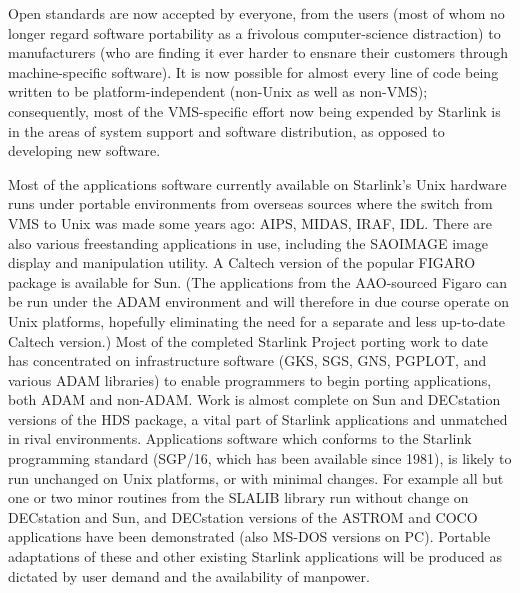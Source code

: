 Open standards are now accepted by everyone, from the users (most
of whom no longer regard software portability as a frivolous
computer-science distraction) to manufacturers (who are finding it
ever harder to ensnare their customers through machine-specific
software).  It is now possible for almost every line of code being
written to be platform-independent (non-Unix as well as non-VMS);
consequently, most of the VMS-specific effort now being expended by
Starlink is in the areas of system support and software distribution, as
opposed to developing new software.

Most of the applications software currently available on Starlink's Unix
hardware runs under portable environments from overseas sources where
the switch from VMS to Unix was made some years ago:  AIPS, MIDAS, IRAF,
IDL.  There are also various freestanding applications in use, including
the SAOIMAGE image display and manipulation utility.  A Caltech version
of the popular FIGARO package is available for Sun.  (The applications
from the AAO-sourced Figaro can be run under the ADAM environment and
will therefore in due course operate on Unix platforms, hopefully
eliminating the need for a separate and less up-to-date Caltech version.)
Most of the completed Starlink Project porting work to date has
concentrated on infrastructure software (GKS, SGS, GNS, PGPLOT, and
various ADAM libraries) to enable programmers to begin porting
applications, both ADAM and non-ADAM.  Work is almost complete on Sun
and DECstation versions of the HDS package, a vital part of Starlink
applications and unmatched in rival environments.  Applications software
which conforms to the Starlink programming standard (SGP/16, which has
been available since 1981), is likely to run unchanged on Unix
platforms, or with minimal changes.  For example all but one or two
minor routines from the SLALIB library run without change on DECstation
and Sun, and DECstation versions of the ASTROM and COCO applications
have been demonstrated (also MS-DOS versions on PC).  Portable
adaptations of these and other existing Starlink applications will be
produced as dictated by user demand and the availability of manpower.

